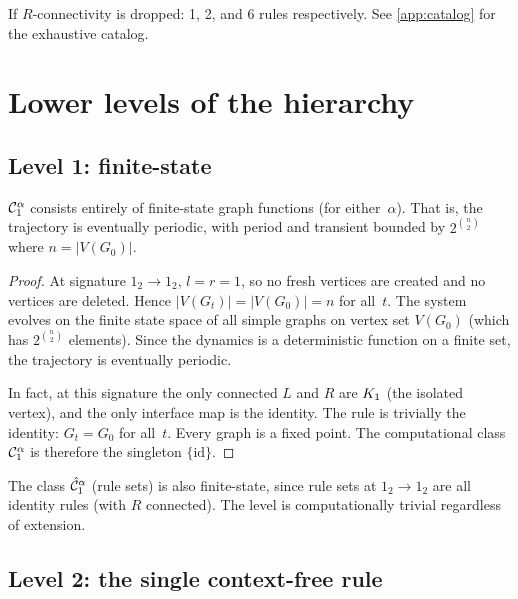 \documentclass{../shared/primo}
\begin{document}
If $R$-connectivity is dropped: 1, 2, and 6 rules respectively. See \cref{app:catalog} for the exhaustive catalog.


\section{Lower levels of the hierarchy}
\label{sec:lower}

\subsection{Level 1: finite-state}
\label{sec:level1}

\begin{theorem}\label{thm:level1}
$\mathcal{C}_{1}^{\alpha}$ consists entirely of finite-state graph functions (for either~$\alpha$). That is, the trajectory is eventually periodic, with period and transient bounded by $2^{\binom{n}{2}}$ where $n = |V(G_0)|$.
\end{theorem}

\begin{proof}
At signature $1_2 \to 1_2$, $l = r = 1$, so no fresh vertices are created and no vertices are deleted. Hence $|V(G_t)| = |V(G_0)| = n$ for all~$t$. The system evolves on the finite state space of all simple graphs on vertex set $V(G_0)$ (which has $2^{\binom{n}{2}}$ elements). Since the dynamics is a deterministic function on a finite set, the trajectory is eventually periodic.

In fact, at this signature the only connected $L$ and $R$ are $K_{1}$ (the isolated vertex), and the only interface map is the identity. The rule is trivially the identity: $G_t = G_0$ for all~$t$. Every graph is a fixed point. The computational class $\mathcal{C}_{1}^{\alpha}$ is therefore the singleton $\{\text{id}\}$.
\end{proof}

\begin{remark}
The class $\hat{\mathcal{C}}_{1}^{\alpha}$ (rule sets) is also finite-state, since rule sets at $1_2 \to 1_2$ are all identity rules (with $R$ connected). The level is computationally trivial regardless of extension.
\end{remark}

\subsection{Level 2: the single context-free rule}
\label{sec:level2}
\end{document}
